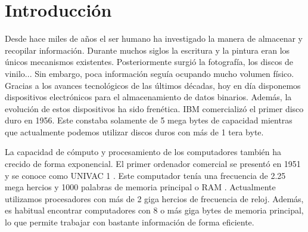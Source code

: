 \documentclass[10pt]{article}
\begin{document}
\renewcommand{\ALG@name}{Algoritmo}
\renewcommand{\listalgorithmname}{Lista de \ALG@name s}

\maketitle



\newpage
\tableofcontents
\newpage


\section{Introducción} \label{sec:introduction}

	Desde hace miles de años el ser humano ha investigado la manera de almacenar y recopilar información. Durante muchos siglos la escritura y la pintura eran los únicos mecanismos existentes. Posteriormente surgió la fotografía, los discos de vinilo... Sin embargo, poca información seguía ocupando mucho volumen físico. Gracias a los avances tecnológicos de las últimos décadas, hoy en día disponemos dispositivos electrónicos para el almacenamiento de datos binarios. Además, la evolución de estos dispositivos ha sido frenética. IBM comercializó el primer disco duro en 1956. Este constaba solamente de 5 mega bytes de capacidad \cite{hard-disks} mientras que actualmente podemos utilizar discos duros con más de 1 tera byte.

	La capacidad de cómputo y procesamiento de los computadores también ha crecido de forma exponencial. El primer ordenador comercial se presentó en 1951 y se conoce como  UNIVAC 1 \cite{first-commercial-computer}. Este computador tenía una frecuencia de 2.25 mega hercios y 1000 palabras de memoria principal o RAM \cite{caract}. Actualmente utilizamos procesadores con más de 2 giga hercios de frecuencia de reloj. Además, es habitual encontrar computadores con 8 o más giga bytes de memoria principal, lo que permite trabajar con bastante información de forma eficiente. 
\end{document}
